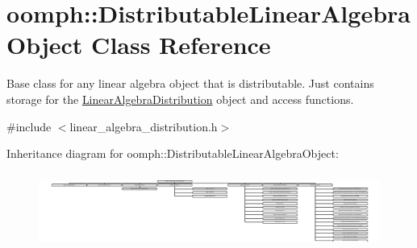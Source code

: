 \hypertarget{classoomph_1_1DistributableLinearAlgebraObject}{}\section{oomph\+:\+:Distributable\+Linear\+Algebra\+Object Class Reference}
\label{classoomph_1_1DistributableLinearAlgebraObject}


Base class for any linear algebra object that is distributable. Just contains storage for the \hyperlink{classoomph_1_1LinearAlgebraDistribution}{Linear\+Algebra\+Distribution} object and access functions.  




{\ttfamily \#include $<$linear\+\_\+algebra\+\_\+distribution.\+h$>$}

Inheritance diagram for oomph\+:\+:Distributable\+Linear\+Algebra\+Object\+:\begin{figure}[H]
\begin{center}
\leavevmode
\includegraphics[height=2.524529cm]{classoomph_1_1DistributableLinearAlgebraObject}
\end{center}
\end{figure}
